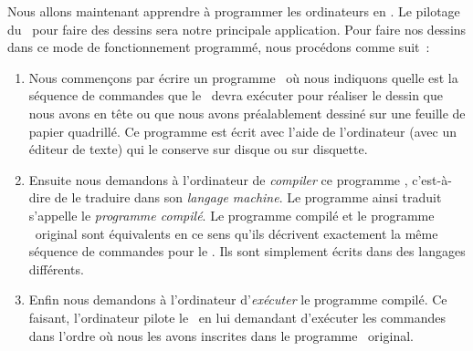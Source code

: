 Nous allons maintenant apprendre à programmer les ordinateurs
en \pascal. Le pilotage du \robot\ pour faire des dessins sera notre 
principale application. Pour faire nos dessins dans
ce mode de fonctionnement programmé, nous procédons comme suit~:
\begin{enumerate}
\item Nous commençons par écrire un programme \pascal\ où nous 
in\-di\-quons quelle est la séquence de commandes que le \robot\ devra 
exécuter pour réaliser le dessin que nous avons en tête ou que
nous avons pré\-a\-la\-ble\-ment dessiné sur une feuille de papier
quadrillé. Ce programme est écrit avec l'aide de l'ordinateur
(avec un éditeur de texte) qui le conserve sur disque ou sur disquette.
\item  Ensuite nous demandons à l'ordinateur de {\em compiler} ce 
programme \pascal, c'est-à-dire de le traduire dans son 
{\em langage machine}.
Le programme ainsi traduit s'appelle le {\em programme compilé}. 
Le programme compilé et le programme
\pascal\ ori\-gi\-nal sont équivalents en ce sens qu'ils décrivent 
exactement la même séquence de commandes pour le \robot. Ils sont
simplement écrits dans des langages différents.
\item  Enfin nous demandons à l'ordinateur  d'{\em exécuter} le 
programme compilé. Ce faisant, l'ordinateur pilote le \robot\ en lui
demandant d'exé\-cu\-ter les commandes dans l'ordre où nous les avons 
inscrites dans le programme \pascal\ ori\-gi\-nal. 
\end{enumerate}

